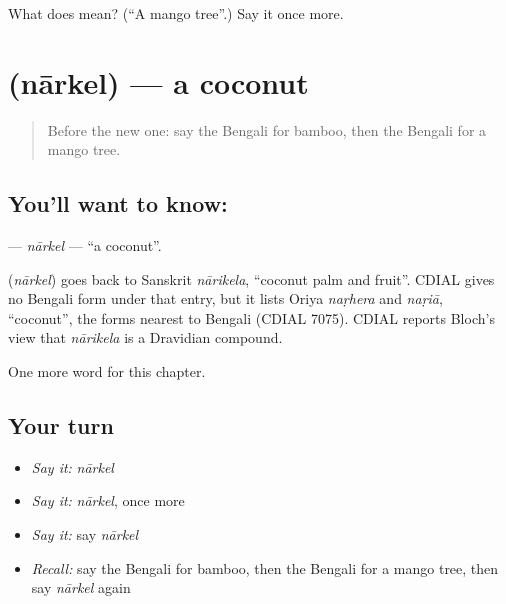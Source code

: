 \begin{tcolorbox}[breakable,colback=teal!4,colframe=teal!35!black,title={Before you move on}]
What does  mean? (\textquotedblleft{}A mango tree\textquotedblright{}.) Say it once more.
\end{tcolorbox}
\section[\texorpdfstring{\bn{নারকেল} (nārkel)}{নারকেল (nārkel)}]{ (nārkel) — a coconut}

\label{lesson:BN-C115-narkel}



\begin{quote}
Before the new one: say the Bengali for bamboo, then the Bengali for a mango tree.
\end{quote}

\subsection*{You'll want to know: }
\textbf{} — \emph{nārkel} — \textquotedblleft{}a coconut\textquotedblright{}.

\begin{cousinweb}
\textbf{} (\emph{nārkel}) goes back to Sanskrit \emph{nārikela}, \textquotedblleft{}coconut palm and fruit\textquotedblright{}. CDIAL gives no Bengali form under that entry, but it lists Oriya \emph{naṛhera} and \emph{naṛiā}, \textquotedblleft{}coconut\textquotedblright{}, the forms nearest to Bengali (CDIAL 7075). CDIAL reports Bloch's view that \emph{nārikela} is a Dravidian compound.
\end{cousinweb}

\begin{grammarlens}[title={What you've built}]
One more word for this chapter.
\end{grammarlens}

\subsection*{Your turn}
\begin{itemize}
\raggedright
  \item \emph{Say it:} \emph{nārkel}
  \item \emph{Say it:} \emph{nārkel}, once more
  \item \emph{Say it:} say \emph{nārkel}
  \item \emph{Recall:} say the Bengali for bamboo, then the Bengali for a mango tree, then say \emph{nārkel} again
\end{itemize}

